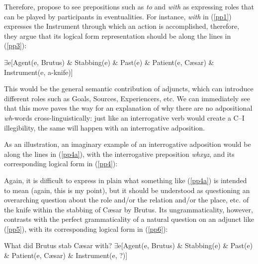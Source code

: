 \documentclass[output=paper]{langsci/langscibook}
\begin{document}
Therefore, \citet{larson.segal1995} propose to see prepositions such as \emph{to} and \emph{with} as expressing roles that can be played by participants in eventualities. For instance, \emph{with} in (\ref{pp1}) expresses the Instrument through which an action is accomplished, therefore, they argue that its logical form representation should be along the lines in (\ref{pp3}):

\begin{exe}
\ex \label{pp3} $\exists$e[Agent(e, Brutus) \& Stabbing(e) \& Past(e) \& Patient(e, C\ae{}sar) \& Instrument(e, a-knife)]
\end{exe}

This would be the general semantic contribution of adjuncts, which can
introduce different roles such as Goals, Sources, Experiencers, etc.
We can immediately see that this move paves the way for an explanation of why
there are no adpositional \emph{wh}-words cross-linguistically:
just like an interrogative verb would create a C--I illegibility, the same will happen with an interrogative adposition.

As an illustration, an imaginary example of an interrogative adposition would
be along the lines in (\ref{pp4a}), with the interrogative preposition
\emph{whxyz}, and its corresponding logical form in (\ref{pp4}):

\begin{exe}
    \ex\label{ex:15.48}
\begin{xlista}
\end{xlista}
\end{exe}

Again, it is difficult to express in plain  what something like
(\ref{pp4a}) is intended to mean (again, this is my point), but it should be
understood as questioning an overarching question about the role and/or the
relation and/or the place, etc. of the knife within the stabbing of C\ae{}sar
by Brutus. Its ungrammaticality, however, contrasts with the perfect
grammaticality of a natural question on an adjunct like (\ref{pp5}), with its
corresponding logical form in (\ref{pp6}):

\begin{exe}
\ex
\begin{xlista}
\ex \label{pp5} What did Brutus stab C\ae{}sar with?
\ex \label{pp6} $\exists$e[Agent(e, Brutus) \& Stabbing(e) \& Past(e) \& Patient(e, C\ae{}sar) \& Instrument(e, ?)]
\end{xlista}
\end{exe}
\end{document}
